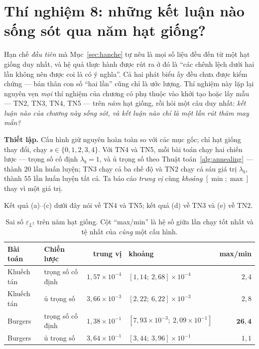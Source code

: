 \section{Thí nghiệm 8: những kết luận nào sống sót qua năm hạt giống?}
\label{sec:tn8}

\begin{thinghiem}
\label{tn:hatgiong}
Hạn chế \emph{đầu tiên} mà Mục~\ref{sec:hanche} tự nêu là mọi số liệu đều đến từ
một hạt giống duy nhất, và hệ quả thực hành được rút ra ở đó là ``các chênh lệch
dưới hai lần không nên được coi là có ý nghĩa''. Cả hai phát biểu ấy đều chưa
được kiểm chứng --- bản thân con số ``hai lần'' cũng chỉ là ước lượng. Thí
nghiệm này lặp lại nguyên vẹn \emph{mọi} thí nghiệm của chương có phụ thuộc vào
khởi tạo hoặc lấy mẫu --- TN2, TN3, TN4, TN5 --- trên \emph{năm} hạt giống, rồi
hỏi một câu duy nhất: \emph{kết luận nào của chương này sống sót, và kết luận
nào chỉ là một lần rút thăm may mắn?}
\end{thinghiem}

\textbf{Thiết lập.} Cấu hình giữ nguyên hoàn toàn so với các mục gốc; chỉ hạt
giống thay đổi, chạy $s \in \{0,1,2,3,4\}$. Với TN4 và TN5, mỗi bài toán chạy
hai chiến lược --- trọng số cố định $\lambda_b = 1$, và ủ trọng số theo
Thuật toán~\ref{alg:annealing} --- thành $20$ lần huấn luyện; TN3 chạy cả ba chế
độ và TN2 chạy cả sáu giá trị $\lambda_b$, thành $55$ lần huấn luyện tất cả. Ta
báo cáo \emph{trung vị} cùng \emph{khoảng} $[\min;\max]$ thay vì một giá trị.

Kết quả (a)--(c) dưới đây nói về TN4 và TN5; kết quả (d) về TN3 và (e) về TN2.

\begin{table}[H]
\centering
\caption[Độ phân tán của sai số giữa năm hạt giống]{Sai số $\varepsilon_{L^2}$
trên năm hạt giống. Cột ``max/min'' là hệ số giữa lần chạy tốt nhất và tệ nhất
của \emph{cùng} một cấu hình.}
\label{tab:tn8-eps}
\small
\begin{tabular}{@{}l l r l r@{}}
\toprule
\textbf{Bài toán} & \textbf{Chiến lược} & \textbf{trung vị} & \textbf{khoảng}
& \textbf{max/min} \\
\midrule
Khuếch tán & trọng số cố định & $1{,}57\times10^{-4}$
  & $[1{,}14;\ 2{,}68]\times10^{-4}$ & $2{,}4$ \\
Khuếch tán & ủ trọng số       & $3{,}66\times10^{-3}$
  & $[2{,}22;\ 6{,}22]\times10^{-3}$ & $2{,}8$ \\
\addlinespace
Burgers    & trọng số cố định & $1{,}38\times10^{-1}$
  & $[7{,}93\times10^{-3};\ 2{,}09\times10^{-1}]$ & $\mathbf{26{,}4}$ \\
Burgers    & ủ trọng số       & $3{,}64\times10^{-1}$
  & $[3{,}44;\ 3{,}96]\times10^{-1}$ & $1{,}1$ \\
\bottomrule
\end{tabular}
\end{table}

